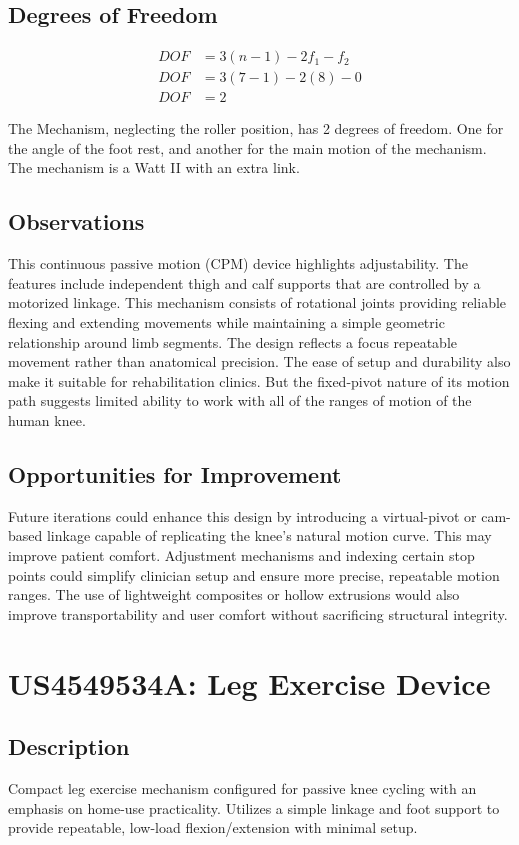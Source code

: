 \documentclass[11pt]{article}
\begin{document}
\subsection{Degrees of Freedom}
\[
\begin{aligned}
DOF &= 3(n-1) - 2f_1 - f_2 \\
DOF &= 3(7-1) - 2(8) - 0 \\
DOF &= 2
\end{aligned}
\]

The Mechanism, neglecting the roller position, has 2 degrees of freedom. One for the angle of the foot rest, and another for the main motion of the mechanism. The mechanism is a Watt II with an extra link.

\subsection{Observations}
This continuous passive motion (CPM) device highlights adjustability. The features include independent thigh and calf supports that are controlled by a motorized linkage. This mechanism consists of rotational joints providing reliable flexing and extending movements while maintaining a simple geometric relationship around limb segments. The design reflects a focus repeatable movement rather than anatomical precision. The ease of setup and durability also make it suitable for rehabilitation clinics. But the fixed-pivot nature of its motion path suggests limited ability to work with all of the ranges of motion of the human knee.

\subsection{Opportunities for Improvement}
Future iterations could enhance this design by introducing a virtual-pivot or cam-based linkage capable of replicating the knee's natural motion curve. This may improve patient comfort. Adjustment mechanisms and indexing certain stop points could simplify clinician setup and ensure more precise, repeatable motion ranges. The use of lightweight composites or hollow extrusions would also improve transportability and user comfort without sacrificing structural integrity.

\section{US4549534A: Leg Exercise Device}
\subsection{Description}
Compact leg exercise mechanism configured for passive knee cycling with an emphasis on home-use practicality. Utilizes a simple linkage and foot support to provide repeatable, low-load flexion/extension with minimal setup.
\end{document}
